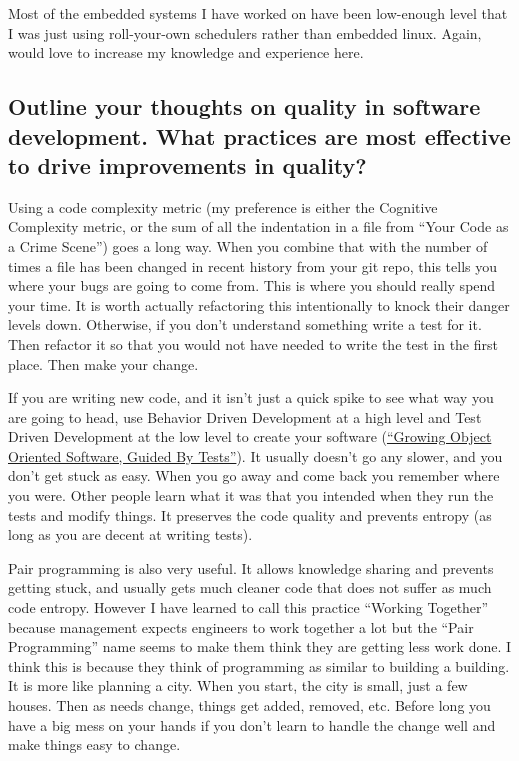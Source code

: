 \documentclass[letter,12pt]{article}
\begin{document}
Most of the embedded systems I have worked on have been low-enough level that I was just using roll-your-own schedulers rather than embedded linux. Again, would love to increase my knowledge and experience here.

\subsection{Outline your thoughts on quality in software development. What practices are most effective to drive improvements in quality?}
Using a code complexity metric (my preference is either the Cognitive Complexity metric, or the sum of all the indentation in a file from ``Your Code as a Crime Scene'') goes a long way. When you combine that with the number of times a file has been changed in recent history from your git repo, this tells you where your bugs are going to come from. This is where you should really spend your time. It is worth actually refactoring this intentionally to knock their danger levels down. Otherwise, if you don't understand something write a test for it. Then refactor it so that you would not have needed to write the test in the first place. Then make your change.

If you are writing new code, and it isn't just a quick spike to see what way you are going to head, use Behavior Driven Development at a high level and Test Driven Development at the low level to create your software (\href{http://www.growing-object-oriented-software.com/}{``Growing Object Oriented Software, Guided By Tests''}). It usually doesn't go any slower, and you don't get stuck as easy. When you go away and come back you remember where you were. Other people learn what it was that you intended when they run the tests and modify things. It preserves the code quality and prevents entropy (as long as you are decent at writing tests).

Pair programming is also very useful. It allows knowledge sharing and prevents getting stuck, and usually gets much cleaner code that does not suffer as much code entropy. However I have learned to call this practice ``Working Together'' because management expects engineers to work together a lot but the ``Pair Programming'' name seems to make them think they are getting less work done. I think this is because they think of programming as similar to building a building. It is more like planning a city. When you start, the city is small, just a few houses. Then as needs change, things get added, removed, etc. Before long you have a big mess on your hands if you don't learn to handle the change well and make things easy to change.
\end{document}
